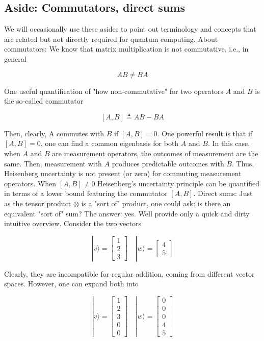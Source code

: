 \documentclass[main.tex]{subfiles}
\begin{document}
\subsection{Aside: Commutators, direct sums}

    We will occasionally use these asides to point out terminology and concepts that are related but not directly required for quantum computing. About commutators: We know that matrix multiplication is not commutative, i.e., in general
    
    $$
    A B \neq B A
    $$
    
    One useful quantification of "how non-commutative" for two operators $A$ and $B$ is the so-called commutator
    
    $$
    [A, B] \triangleq A B-B A
    $$
    
    Then, clearly, A commutes with $B$ if $[A, B]=0$. One powerful result is that if $[A, B]=0$, one can find a common eigenbasis for both $A$ and $B$. In this case, when $A$ and $B$ are measurement operators, the outcomes of measurement are the same. Then, measurement with $A$ produces predictable outcomes with $B$. Thus, Heisenberg uncertainty is not present (or zero) for commuting measurement operators. When $[A, B] \neq 0$ Heisenberg's uncertainty principle can be quantified in terms of a lower bound featuring the commutator $[A, B]$. Direct sums: Just as the tensor product $\otimes$ is a "sort of" product, one could ask: is there an equivalent "sort of" sum? The answer: yes. Well provide only a quick and dirty intuitive overview. Consider the two vectors
    
    $$
    |v\rangle=\left[\begin{array}{l}
    1 \\
    2 \\
    3
    \end{array}\right] \quad|w\rangle=\left[\begin{array}{l}
    4 \\
    5
    \end{array}\right]
    $$
    
    Clearly, they are incompatible for regular addition, coming from different vector spaces. However, one can expand both into
    
    $$
    |v\rangle=\left[\begin{array}{l}
    1 \\
    2 \\
    3 \\
    0 \\
    0
    \end{array}\right] \quad|w\rangle=\left[\begin{array}{l}
    0 \\
    0 \\
    0 \\
    4 \\
    5
    \end{array}\right]
    $$
    
\end{document}
